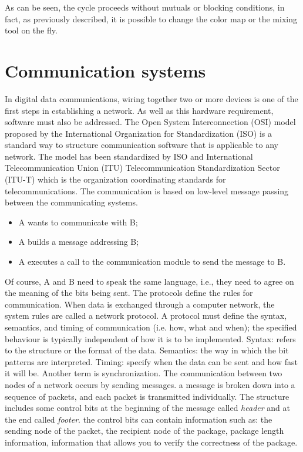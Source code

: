 As can be seen, the cycle proceeds without mutuals or blocking conditions, in
fact, as previously described, it is possible to change the color map or the
mixing tool on the fly.
%
\newpage
\section{Communication systems}
\label{sec:software-TCPSocket}
In digital data communications, wiring together two or more devices is one of
the first steps in establishing a network. As well as this hardware requirement,
software must also be addressed. The Open System Interconnection (OSI) model
proposed by the International Organization for Standardization (ISO) is a
standard way to structure communication software that is applicable to any
network. The model has been standardized by ISO and International
Telecommunication Union (ITU) Telecommunication Standardization Sector (ITU-T)
which is the organization coordinating standards for telecommunications. 
The
communication is based on low-level message passing between the communicating
systems.
\begin{itemize}
\item A wants to communicate with B; 
\item A builds a message addressing B; 
\item A executes a call to the communication module to send the message to B.
\end{itemize}
Of course, A and B need to speak the same language, i.e., they need to agree on the meaning
of the bits being sent. The protocols define the rules for communication. 
When
data is exchanged through a computer network, the system rules are called a
network protocol. A protocol must define the syntax, semantics, and timing of
communication (i.e. how, what and when); the specified behaviour is typically
independent of how it is to be implemented. Syntax: refers to the structure or
the format of the data. Semantics: the way in which the bit patterns are
interpreted. Timing: specify when the data can be sent and how fast it will be.
Another term is synchronization.
The communication between two nodes of a network occurs by sending messages. a
message is broken down into a sequence of packets, and each packet is
transmitted individually.
The structure includes some control bits at the beginning of the message called
\emph{header} and at the end called \emph{footer}.
the control bits can contain information such as: the sending node of the
packet, the recipient node of the package, package length information,
information that allows you to verify the correctness of the package. \cite{mandrioli2008informatica}
%
